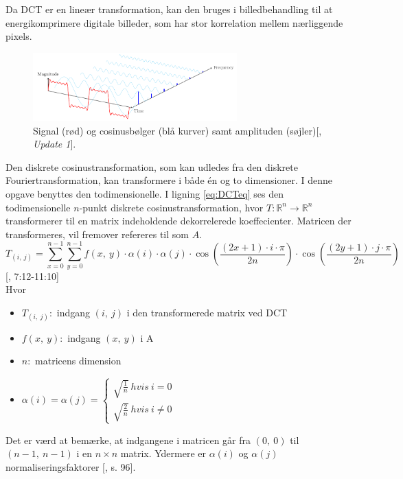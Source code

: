 Da DCT er en lineær transformation, kan den bruges i billedbehandling til at energikomprimere digitale billeder, som har stor korrelation mellem nærliggende pixels.\\
\begin{figure}[htbp]
\centering
\includegraphics[width=0.7\textwidth]{Billeder/frequencydomain.png}
\caption{Signal (rød) og cosinusbølger (blå kurver) samt amplituden (søjler)[\citet{frequency_image}, \textit{Update 1}].}
\label{fig:frequencydomain}
\end{figure}
Den diskrete cosinustransformation, som kan udledes fra den diskrete Fouriertransformation, kan transformere i både én og to dimensioner. I denne opgave benyttes den todimensionelle. I ligning \vref{eq:DCTeq} ses den todimensionelle $n$-punkt diskrete cosinustransformation, hvor $T:\mathbb{R}^n \longrightarrow \mathbb{R}^n$ transformerer til en matrix indeholdende dekorrelerede koeffecienter. Matricen der transformeres, vil fremover refereres til som $A$. 
\begin{equation}
T_{(i,\ j)}=\sum\limits_{x=0}^{n-1} \sum\limits_{y=0}^{n-1} f(x,\ y) \cdot \alpha(i) \cdot \alpha(j) \cdot \cos\left(\frac{(2x+1) \cdot i \cdot \pi}{2n}\right) \cdot \cos\left(\frac{(2y+1) \cdot j \cdot \pi}{2n}\right)
\label{eq:DCTeq}
\end{equation} [\citet{guillermo_sapiro}, 7:12-11:10]\\
Hvor
\begin{itemize}
\item $T_{(i,\ j)}:$ indgang $(i,\ j)$ i den transformerede matrix ved DCT
\item $f(x,\ y):$ indgang $(x,\ y)$ i A
\item $n:$ matricens dimension
\item $\alpha(i)=\alpha(j)= \begin{cases}
					\sqrt{\frac{1}{n}} \ hvis \ i = 0\\
					\sqrt{\frac{2}{n}} \ hvis \ i \neq 0
					\end{cases}$
\end{itemize}
Det er værd at bemærke, at indgangene i matricen går fra $(0,\ 0)$ til $(n-1,\ n-1)$ i en $n \times n$ matrix. Ydermere er $\alpha(i)$  og $\alpha(j)$ normaliseringsfaktorer [\citet{normalization}, s. 96].

